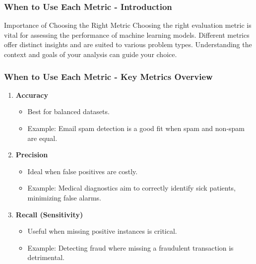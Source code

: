 \documentclass[aspectratio=169]{beamer}
\begin{document}
\begin{frame}[fragile]
    \frametitle{When to Use Each Metric - Introduction}
    \begin{block}{Importance of Choosing the Right Metric}
        Choosing the right evaluation metric is vital for assessing the performance of machine learning models. Different metrics offer distinct insights and are suited to various problem types. Understanding the context and goals of your analysis can guide your choice.
    \end{block}
\end{frame}

\begin{frame}[fragile]
    \frametitle{When to Use Each Metric - Key Metrics Overview}
    \begin{enumerate}
        \item \textbf{Accuracy}
            \begin{itemize}
                \item Best for balanced datasets.
                \item Example: Email spam detection is a good fit when spam and non-spam are equal.
            \end{itemize}
        
        \item \textbf{Precision}
            \begin{itemize}
                \item Ideal when false positives are costly.
                \item Example: Medical diagnostics aim to correctly identify sick patients, minimizing false alarms.
            \end{itemize}
        
        \item \textbf{Recall (Sensitivity)}
            \begin{itemize}
                \item Useful when missing positive instances is critical.
                \item Example: Detecting fraud where missing a fraudulent transaction is detrimental.
            \end{itemize}
    \end{enumerate}
\end{frame}
\end{document}
